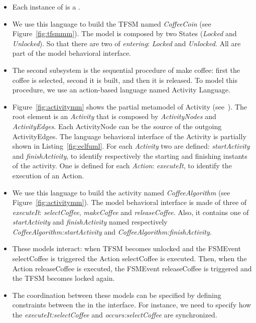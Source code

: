\begin{itemize}
	\item Each instance of \dse is a \mse. 
	
	\item We use this language to build the TFSM named \emph{CoffeeCoin} (see Figure~\ref{fig:tfsmmm}). The model is composed by two States (\emph{Locked} and \emph{Unlocked}). So that there are two \mse of \textit{entering}: \textit{Locked} and \textit{Unlocked}. All \mse are part of the model behavioral interface. 
	
	\item The second subsystem is the sequential procedure of make coffee: first the coffee is selected, second it is built, and then it is released. To model this procedure, we use an action-based language named Activity Language. 
	
	\item Figure~\ref{fig:activitymm} shows the partial metamodel of Activity (see~\cite{ttc15bib}). The root element is an \emph{Activity} that is composed by \emph{ActivityNodes} and \emph{ActivityEdges}. Each ActivityNode can be the source of the outgoing ActivityEdges. The language behavioral interface of the Activity is partially shown in  Listing~\ref{fig:eclfuml}. For each \emph{Activity} two \dse are defined: \emph{startActivity} and \emph{finishActivity}, to identify respectively the starting and finishing instants of the activity. One \dse is defined for each \emph{Action}: \emph{executeIt}, to identify the execution of an Action.

	\item We use this language to build the activity named \emph{CoffeeAlgorithm} (see Figure~\ref{fig:activitymm}). The model behavioral interface is made of three \mse of \emph{executeIt}: \emph{selectCoffee}, \emph{makeCoffee} and \emph{releaseCoffee}. Also, it contains one \mse of \emph{startActivity} and \emph{finishActivity} named respectively \emph{CoffeeAlgorithm:startActivity} and \emph{CoffeeAlgorithm:finishActivity}.
	
	\item These models interact: when TFSM becomes unlocked and the FSMEvent selectCoffee is triggered the Action selectCoffee is executed. Then, when the Action releaseCoffee is executed, the FSMEvent releaseCoffee is triggered and the TFSM becomes locked again.
	
	\item The coordination between these models can be specified by defining constraints between the \mse in the interface. For instance, we need to specify how the \mse \emph{executeIt:selectCoffee} and \emph{occurs:selectCoffee} are synchronized. 


\end{itemize}
